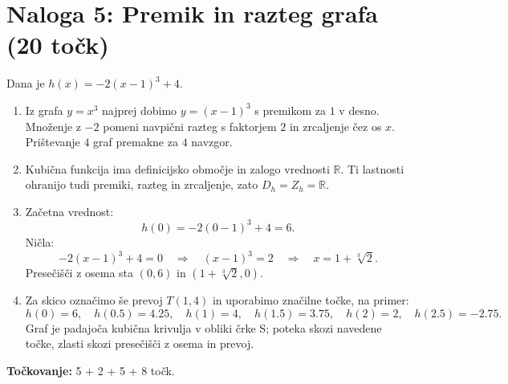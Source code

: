 \documentclass[a4paper,12pt]{article}
\begin{document}
\section*{Naloga 5: Premik in razteg grafa \hfill\normalfont\normalsize(20 točk)}
Dana je $h(x)=-2(x-1)^3+4$.
\begin{enumerate}[label=\arabic*)]
	\item Iz grafa $y=x^3$ najprej dobimo $y=(x-1)^3$ s premikom za $1$ v desno. Množenje z $-2$ pomeni navpični razteg s faktorjem $2$ in zrcaljenje čez os $x$. Prištevanje $4$ graf premakne za $4$ navzgor.
	\item Kubična funkcija ima definicijsko območje in zalogo vrednosti $\mathbb{R}$. Ti lastnosti ohranijo tudi premiki, razteg in zrcaljenje, zato $D_h=Z_h=\mathbb{R}$.
	\item Začetna vrednost:
	\[
		h(0)=-2(0-1)^3+4=6.
	\]
	Ničla:
	\[
		-2(x-1)^3+4=0\quad\Longrightarrow\quad (x-1)^3=2
		\quad\Longrightarrow\quad x=1+\sqrt[3]{2}.
	\]
	Presečišči z osema sta $(0,6)$ in $(1+\sqrt[3]{2},0)$.
	\item Za skico označimo še prevoj $T(1,4)$ in uporabimo značilne točke, na primer:
	\[
		h(0)=6,\quad h(0.5)=4.25,\quad h(1)=4,\quad h(1.5)=3.75,\quad h(2)=2,\quad h(2.5)=-2.75.
	\]
	Graf je padajoča kubična krivulja v obliki črke S; poteka skozi navedene točke, zlasti skozi presečišči z osema in prevoj.
\end{enumerate}
\textbf{Točkovanje:} 5 + 2 + 5 + 8 točk.

\newpage
\end{document}
